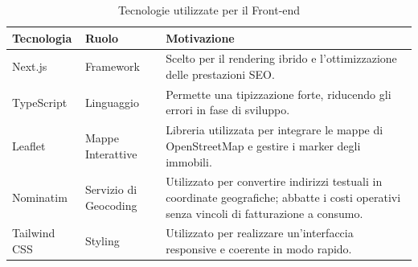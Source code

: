 \documentclass{article}
\begin{document}
\begin{table}[htbp]
\centering
\caption{Tecnologie utilizzate per il Front-end} %
\vspace{0.5em}
\renewcommand{\arraystretch}{1.5}
\begin{tabularx}{\textwidth}{|l|l|X|}
\hline
\rowcolor[HTML]{010066} 
{\color[HTML]{EFEFEF} \textbf{Tecnologia}} & {\color[HTML]{FFFFFF} \textbf{Ruolo}} & {\color[HTML]{FFFFFF} \textbf{Motivazione}} \\ \hline

Next.js & Framework & Scelto per il rendering ibrido e l'ottimizzazione delle prestazioni SEO. \\ \hline

TypeScript & Linguaggio & Permette una tipizzazione forte, riducendo gli errori in fase di sviluppo. \\ \hline

Leaflet & Mappe Interattive & Libreria utilizzata per integrare le mappe di OpenStreetMap e gestire i marker degli immobili. \\ \hline
Nominatim & Servizio di Geocoding & Utilizzato per convertire indirizzi testuali in coordinate geografiche; abbatte i costi operativi senza vincoli di fatturazione a consumo. \\ \hline

Tailwind CSS & Styling & Utilizzato per realizzare un'interfaccia responsive e coerente in modo rapido. \\ \hline
\end{tabularx}
\end{table}
\end{document}
